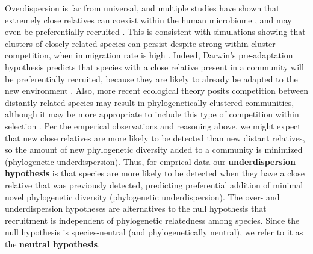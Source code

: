 \documentclass{article}
\begin{document}
\par
Overdispersion is far from universal, and multiple studies have shown that extremely close relatives can coexist within the human microbiome \cite{Li2016,Tett2019,Stecher2010}, and may even be preferentially recruited \cite{Brown2018}. This is consistent with simulations showing that clusters of closely-related species can persist despite strong within-cluster competition, when immigration rate is high \cite{DAndrea2019}. Indeed, Darwin’s pre-adaptation hypothesis predicts that species with a close relative present in a community will be preferentially recruited, because they are likely to already be adapted to the new environment \cite{Darwin1859}. Also, more recent ecological theory posits competition between distantly-related species may result in phylogenetically clustered communities, although it may be more appropriate to include this type of competition within selection \cite{Mayfield2010}. Per the emperical observations and reasoning above, we might expect that new close relatives are more likely to be detected than new distant relatives, so the amount of new phylogenetic diversity added to a community is minimized (phylogenetic underdispersion). Thus, for emprical data our \textbf{underdispersion hypothesis} is that species are more likely to be detected when they have a close relative that was previously detected, predicting preferential addition of minimal novel phylogenetic diversity (phylogenetic underdispersion). The over- and underdispersion hypotheses are alternatives to the null hypothesis that recruitment is independent of phylogenetic relatedness among species. Since the null hypothesis is species-neutral (and phylogenetically neutral), we refer to it as the \textbf{neutral hypothesis}.
\par
\end{document}
